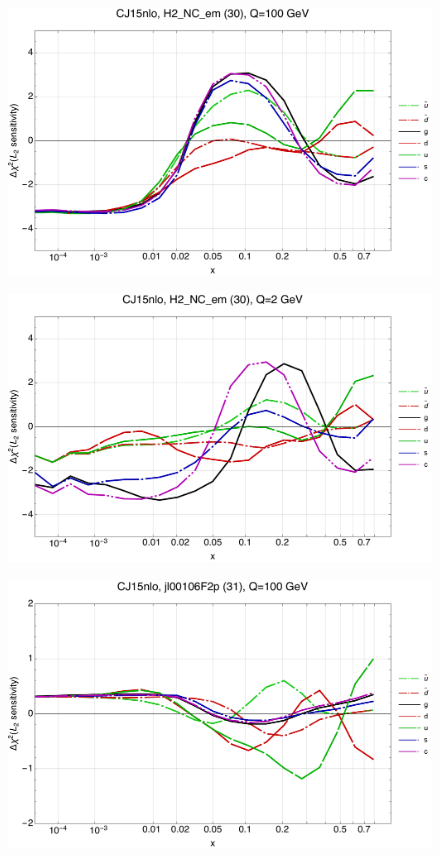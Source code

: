 \documentclass[10pt,aps,prd,floatfix,titlepage]{revtex4}
\begin{document}
\clearpage
\begin{figure}
\includegraphics[width=\textwidth,height=0.44\textheight,keepaspectratio]{1/30_CJ15nlo_L2_q100_Sf_1.pdf}
\caption{}
\end{figure}
\begin{figure}
\includegraphics[width=\textwidth,height=0.44\textheight,keepaspectratio]{1/30_CJ15nlo_L2_q2_Sf_1.pdf}
\caption{}
\end{figure}
\clearpage
\begin{figure}
\includegraphics[width=\textwidth,height=0.44\textheight,keepaspectratio]{1/31_CJ15nlo_L2_q100_Sf_1.pdf}
\caption{}
\end{figure}
\end{document}
